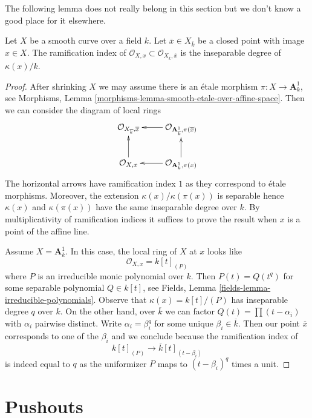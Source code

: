 \noindent
The following lemma does not really belong in this section
but we don't know a good place for it elsewhere.

\begin{lemma}
\label{lemma-ramification-to-algebraic-closure}
Let $X$ be a smooth curve over a field $k$. Let
$\overline{x} \in X_{\overline{k}}$ be a closed
point with image $x \in X$. The ramification index of
$\mathcal{O}_{X, x} \subset \mathcal{O}_{X_{\overline{k}}, \overline{x}}$
is the inseparable degree of $\kappa(x)/k$.
\end{lemma}

\begin{proof}
After shrinking $X$ we may assume there is an \'etale morphism
$\pi : X \to \mathbf{A}^1_k$, see
Morphisms, Lemma \ref{morphisms-lemma-smooth-etale-over-affine-space}.
Then we can consider the diagram of local rings
$$
\xymatrix{
\mathcal{O}_{X_{\overline{k}}, \overline{x}} &
\mathcal{O}_{\mathbf{A}^1_{\overline{k}}, \pi(\overline{x})} \ar[l] \\
\mathcal{O}_{X, x} \ar[u] &
\mathcal{O}_{\mathbf{A}^1_k, \pi(x)} \ar[l] \ar[u]
}
$$
The horizontal arrows have ramification index $1$ as they correspond to
\'etale morphisms. Moreover, the extension $\kappa(x)/\kappa(\pi(x))$ is
separable hence $\kappa(x)$ and $\kappa(\pi(x))$ have the same
inseparable degree over $k$.
By multiplicativity of ramification indices it suffices to
prove the result when $x$ is a point of the affine line.

\medskip\noindent
Assume $X = \mathbf{A}^1_k$. In this case, the local ring of $X$ at $x$
looks like
$$
\mathcal{O}_{X, x} = k[t]_{(P)}
$$
where $P$ is an irreducible monic polynomial over $k$.
Then $P(t) = Q(t^q)$ for some separable polynomial $Q \in k[t]$, see
Fields, Lemma \ref{fields-lemma-irreducible-polynomials}.
Observe that $\kappa(x) = k[t]/(P)$ has inseparable degree $q$
over $k$. On the other hand, over $\overline{k}$ we can factor
$Q(t) = \prod (t - \alpha_i)$ with $\alpha_i$ pairwise distinct.
Write $\alpha_i = \beta_i^q$ for some unique $\beta_i \in \overline{k}$.
Then our point $\overline{x}$ corresponds to one of the $\beta_i$
and we conclude because the ramification index of
$$
k[t]_{(P)} \longrightarrow \overline{k}[t]_{(t - \beta_i)}
$$
is indeed equal to $q$ as the uniformizer $P$ maps to
$(t - \beta_i)^q$ times a unit.
\end{proof}





\section{Pushouts}
\label{section-pushouts}

